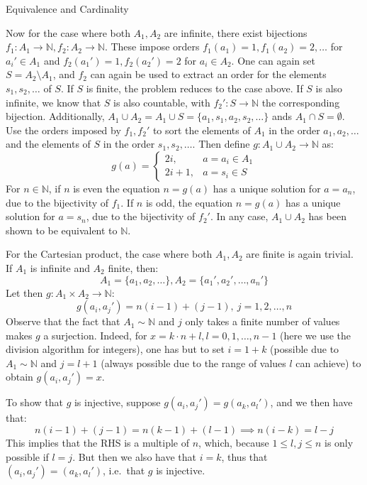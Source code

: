 \begin{section}{Equivalence and Cardinality}
\begin{solution}
\begin{itemize}
        Now for the case where both $A_1, A_2$ are infinite, there exist bijections $f_1 : A_1 \rightarrow \mathbb{N}, f_2 : A_2 \rightarrow \mathbb{N}$. 
        These impose orders $f_1(a_1) = 1, f_1(a_2) = 2, \ldots$ for $a_i' \in A_1$ and $f_2(a_1') = 1, f_2(a_2') = 2$ for $a_i \in A_2$.
        One can again set $S = A_2 \setminus A_1$, and $f_2$ can again be used to extract an order for the elements $s_1, s_2, \ldots$ of $S$. 
        If $S$ is finite, the problem reduces to the case above.
        If $S$ is also infinite, we know that $S$ is also countable, with $f_2': S \rightarrow \mathbb{N}$ the corresponding bijection.
        Additionally, $A_1 \cup A_2 = A_1 \cup S = \{a_1, s_1, a_2, s_2, \ldots\}$ ands $A_1 \cap S = \emptyset$. 
        Use the orders imposed by $f_1, f_2'$ to sort the elements of $A_1$ in the order $a_1, a_2, \ldots$ and the elements of $S$ in the order $s_1, s_2, \ldots$. 
        Then define $g:A_1 \cup A_2 \rightarrow \mathbb{N}$ as:
        $$g(a) = \begin{cases} 2i, & a = a_i \in A_1 \\
            2i + 1, & a = s_i \in S
            \end{cases}$$
        For $n \in \mathbb{N}$, if $n$ is even the equation $n = g(a)$ has a unique solution for $a = a_n$, due to the bijectivity of $f_1$.
        If $n$ is odd, the equation $n = g(a)$ has a unique solution for $a = s_n$, due to the bijectivity of $f_2'$. In any case, $A_1 \cup A_2$ has been shown to be equivalent to $\mathbb{N}$.

        For the Cartesian product, the case where both $A_1, A_2$ are finite is again trivial. 
        If $A_1$ is infinite and $A_2$ finite, then:
        $$A_1 = \{a_1, a_2, \ldots\}, A_2 = \{a_1', a_2', \ldots, a_n'\}$$
        Let then $g: A_1 \times A_2 \rightarrow \mathbb{N}$:
        $$g(a_i, a_j') = n(i-1) + (j - 1), \ j = 1, 2, \ldots, n$$
        Observe that the fact that $A_1 \sim \mathbb{N}$  and $j$ only takes a finite number of values makes $g$ a surjection. Indeed, for $x = k\cdot n + l, l = 0, 1, \ldots, n - 1$ (here we use the division algorithm for integers), one has but to set $i = 1 + k$ (possible due to $A_1 \sim \mathbb{N}$ and $j = l + 1$  (always possible due to the range of values $l$ can achieve) to obtain $g(a_i, a_j') = x$.\

        To show that $g$ is injective, suppose $g(a_i, a_j') = g(a_k, a_l')$, and we then have that:
        $$n(i - 1) + (j - 1) = n(k - 1) + (l - 1) \implies n(i - k) = l - j$$
        This implies that the RHS is a multiple of $n$, which, because $1 \leq l, j \leq n$ is only possible if $l = j$. But then we also have that $i = k$, thus that $(a_i, a_j') = (a_k, a_l')$, i.e.\ that $g$ is injective.


\end{itemize}
\end{solution}
\end{section}
